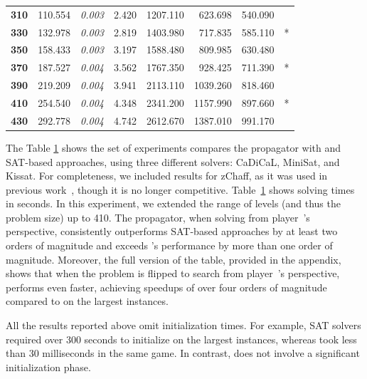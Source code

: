 \documentclass[runningheads]{llncs}
\begin{document}
\begin{table}[ht]
\begin{tabular}{r|r|>{\itshape}r|r|rrrr}
\textbf{310} & 110.554 & 0.003 & \cellcolor{gray!30}2.420 & 1207.110& 623.698 & 540.090 &       \\
\textbf{330} & 132.978 & 0.003 & \cellcolor{gray!30}2.819 & 1403.980& 717.835 & 585.110 & *     \\
\textbf{350} & 158.433 & 0.003 & \cellcolor{gray!30}3.197 & 1588.480& 809.985 & 630.480 &       \\
\textbf{370} & 187.527 & 0.004 & \cellcolor{gray!30}3.562 & 1767.350& 928.425 & 711.390 & *     \\
\textbf{390} & 219.209 & 0.004 & \cellcolor{gray!30}3.941 & 2113.110& 1039.260& 818.460 &       \\
\textbf{410} & 254.540 & 0.004 & \cellcolor{gray!30}4.348 & 2341.200& 1157.990& 897.660 & *     \\
\textbf{430} & 292.778 & 0.004 & \cellcolor{gray!30}4.742 & 2612.670& 1387.010& 991.170 &       \\
\bottomrule
\end{tabular}
\label{tab:jurd-appendix}
\end{table}

The Table \ref{tab:jurd-appendix} shows the set of experiments compares the \noc propagator with \zra and SAT-based approaches, using three different solvers: CaDiCaL, MiniSat, and Kissat. For completeness, we included results for zChaff, as it was used in previous work~\cite{Heljanko:2012}, though it is no longer competitive. Table~\ref{tab:jurd-appendix} shows solving times in seconds. In this experiment, we extended the range of levels (and thus the problem size) up to 410. The \nocmemo propagator, when solving from player~\even’s perspective, consistently outperforms SAT-based approaches by at least two orders of magnitude and exceeds \zra's performance by more than one order of magnitude. Moreover, the full version of the table, provided in the appendix, shows that when the problem is flipped to search from player~\odd’s perspective, \noceager performs even faster, achieving speedups of over four orders of magnitude compared to \zra on the largest instances.

All the results reported above omit initialization times. For example, SAT solvers required over 300 seconds to initialize on the largest instances, whereas \noc took less than 30 milliseconds in the same game. In contrast, \zra does not involve a significant initialization phase.

\end{document}
